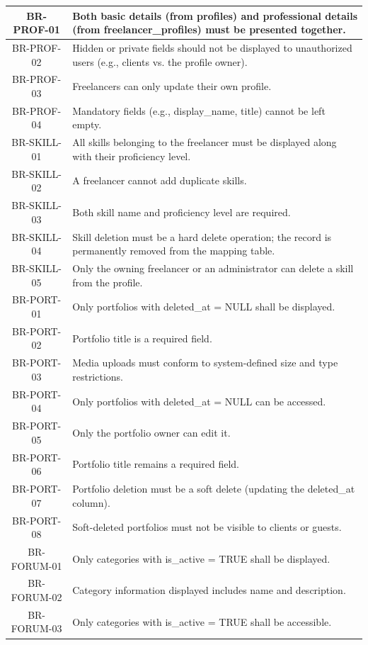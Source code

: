 \begin{longtable}{|c|p{12cm}|}
    BR-PROF-01 & Both basic details (from profiles) and professional details (from freelancer\_profiles) must be presented together. \\ \hline
    BR-PROF-02 & Hidden or private fields should not be displayed to unauthorized users (e.g., clients vs. the profile owner). \\ \hline
    BR-PROF-03 & Freelancers can only update their own profile. \\ \hline
    BR-PROF-04 & Mandatory fields (e.g., display\_name, title) cannot be left empty. \\ \hline
    BR-SKILL-01 & All skills belonging to the freelancer must be displayed along with their proficiency level. \\ \hline
    BR-SKILL-02 & A freelancer cannot add duplicate skills. \\ \hline
    BR-SKILL-03 & Both skill name and proficiency level are required. \\ \hline
    BR-SKILL-04 & Skill deletion must be a hard delete operation; the record is permanently removed from the mapping table. \\ \hline
    BR-SKILL-05 & Only the owning freelancer or an administrator can delete a skill from the profile. \\ \hline
    BR-PORT-01 & Only portfolios with deleted\_at = NULL shall be displayed. \\ \hline
    BR-PORT-02 & Portfolio title is a required field. \\ \hline
    BR-PORT-03 & Media uploads must conform to system-defined size and type restrictions. \\ \hline
    BR-PORT-04 & Only portfolios with deleted\_at = NULL can be accessed. \\ \hline
    BR-PORT-05 & Only the portfolio owner can edit it. \\ \hline
    BR-PORT-06 & Portfolio title remains a required field. \\ \hline
    BR-PORT-07 & Portfolio deletion must be a soft delete (updating the deleted\_at column). \\ \hline
    BR-PORT-08 & Soft-deleted portfolios must not be visible to clients or guests. \\ \hline
    BR-FORUM-01 & Only categories with is\_active = TRUE shall be displayed. \\ \hline
    BR-FORUM-02 & Category information displayed includes name and description. \\ \hline
    BR-FORUM-03 & Only categories with is\_active = TRUE shall be accessible. \\ \hline

\end{longtable}
